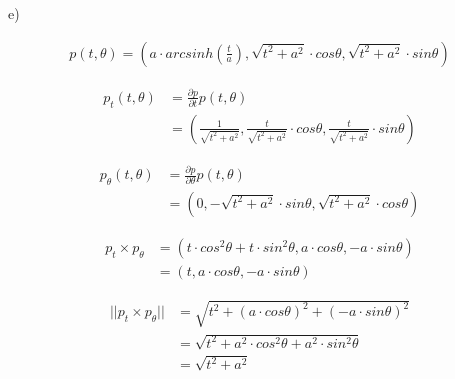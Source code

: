 \documentclass[12pt, a4paper]{article}
\begin{document}
\newpage

e)

\begin{equation}
    \begin{split}
        p(t, \theta) = \left(a \cdot arcsinh\left(\frac{t}{a}\right), \sqrt{t^2 + a^2} \cdot cos\theta, \sqrt{t^2 + a^2} \cdot sin\theta \right)
    \end{split}
\end{equation}

\begin{equation}
    \begin{split}
        p_t(t, \theta) &= \frac{\partial p}{\partial t} p(t, \theta) \\
                       &= \left(\frac{1}{\sqrt{t^2 + a^2}}, \frac{t}{\sqrt{t^2 + a^2}} \cdot cos\theta, \frac{t}{\sqrt{t^2 + a^2}} \cdot sin\theta \right)
    \end{split}
\end{equation}

\begin{equation}
    \begin{split}
        p_\theta(t,\theta) &= \frac{\partial p}{\partial \theta} p(t, \theta) \\
                           &= \left(0, -\sqrt{t^2 + a^2} \cdot sin\theta, \sqrt{t^2 + a^2} \cdot cos\theta   \right)
    \end{split}
\end{equation}

\begin{equation}
    \begin{split}
        p_t \times p_\theta &= \left(t \cdot cos^2\theta + t \cdot sin^2\theta, a \cdot cos\theta, -a \cdot sin\theta    \right) \\
                            &= \left(t, a \cdot cos\theta, -a \cdot sin\theta  \right)
    \end{split}
\end{equation}

\begin{equation}
    \begin{split}
        ||p_t \times p_\theta|| &= \sqrt{t^2 + (a \cdot cos\theta)^2 + (-a \cdot sin\theta)^2} \\
                                &= \sqrt{t^2 + a^2 \cdot cos^2\theta + a^2 \cdot sin^2\theta} \\
                                &= \sqrt{t^2 + a^2}
    \end{split}
\end{equation}
\end{document}
